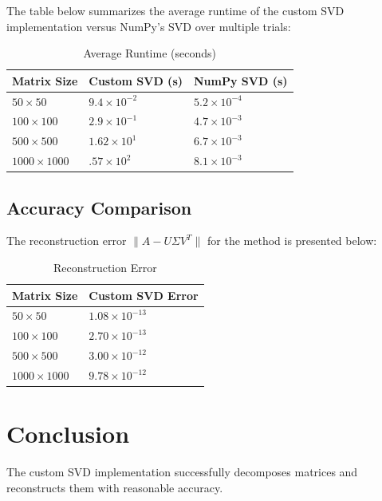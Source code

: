 \documentclass[a4paper, 12pt]{article}
\begin{document}
The table below summarizes the average runtime of the custom SVD implementation versus NumPy's SVD over multiple trials:

\begin{table}[h]
    \centering
    \caption{Average Runtime (seconds)}
    \begin{tabular}{@{}lll@{}}
        \toprule
        Matrix Size & Custom SVD (s) & NumPy SVD (s) \\ \midrule
        $50 \times 50$ & $9.4 \times 10^{-2}$ & $5.2 \times 10^{-4}$ \\
        $100 \times 100$ & $2.9 \times 10^{-1}$ & $4.7 \times 10^{-3}$ \\
        $500 \times 500$ & $1.62 \times 10^1$ & $6.7 \times 10^{-3}$ \\
        $1000 \times 1000$ & $.57 \times 10^2$ & $8.1 \times 10^{-3}$ \\
        \bottomrule
    \end{tabular}
\end{table}

\subsection*{Accuracy Comparison}

The reconstruction error $\| A - U \Sigma V^T \|$ for the method is presented below:

\begin{table}[h]
    \centering
    \caption{Reconstruction Error}
    \begin{tabular}{@{}ll@{}}
        \toprule
        Matrix Size & Custom SVD Error \\ \midrule
        $50 \times 50$ & $1.08 \times 10^{-13}$ \\ 
        $100 \times 100$ & $2.70 \times 10^{-13}$ \\ 
        $500 \times 500$ & $3.00 \times 10^{-12}$ \\ 
        $1000 \times 1000$ & $9.78 \times 10^{-12}$ \\ 
        \bottomrule
    \end{tabular}
\end{table}


\section*{Conclusion}

The custom SVD implementation successfully decomposes matrices and reconstructs them with reasonable accuracy.
\end{document}
